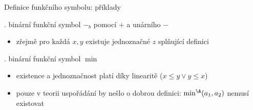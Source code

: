 \documentclass{beamer}
\begin{document}
\begin{frame}{Definice funkčního symbolu: příklady}
    
    \pause 

    \bigskip

    .  binární funkční symbol \alert{$-_b$} pomocí $+$ a unárního $-$
        

    \pause 
    \begin{itemize}
        \item zřejmě pro každá $x,y$ \alert{existuje} \alert{jednoznačné} $z$ splňující definici  
    \end{itemize}
        
    \bigskip
    
    .  binární funkční symbol \alert{$\min$}
        

    \pause 
    \begin{itemize}
        \item existence a jednoznačnost platí díky linearitě ($x\leq y\lor y\leq x$)\pause 
        \item pouze v teorii uspořádání by nešlo o dobrou definici: $\min^\A(a_1,a_2)$ nemusí existovat
    \end{itemize}        
    
\end{frame}
\end{document}
